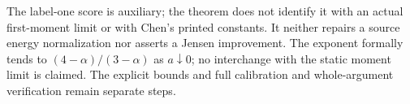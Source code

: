 The label-one score is auxiliary; the theorem does not identify it with
an actual first-moment limit or with Chen's printed constants.
It neither repairs a source energy normalization nor asserts a Jensen
improvement. The exponent formally tends to $(4-\alpha)/(3-\alpha)$
as $a\downarrow0$; no interchange with the static moment limit is claimed.
The explicit bounds and full calibration and whole-argument verification
remain separate steps.
